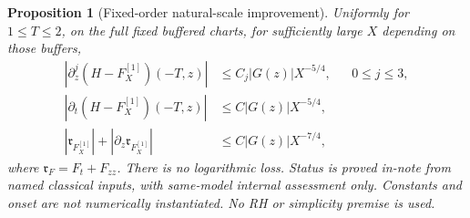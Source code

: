 \documentclass[11pt]{article}
\newtheorem{proposition}{Proposition}[section]
\numberwithin{equation}{section}
\begin{document}
\begin{proposition}[Fixed-order natural-scale improvement]
\label{prop:first-negative-correction}
Uniformly for \(1\le T\le2\), on the full fixed buffered charts, for
sufficiently large \(X\) depending on those buffers,
\begin{align}
 |\partial_z^j(H-F_X^{[1]})(-T,z)|
       &\le C_j|G(z)|X^{-5/4},&&0\le j\le3,
       \label{eq:first-negative-jets}\\
 |\partial_t(H-F_X^{[1]})(-T,z)|
       &\le C|G(z)|X^{-5/4},
       \label{eq:first-negative-time}\\
 |\mathfrak r_{F_X^{[1]}}|+|\partial_z\mathfrak r_{F_X^{[1]}}|
       &\le C|G(z)|X^{-7/4},
       \label{eq:first-negative-residual}
\end{align}
where \(\mathfrak r_F=F_t+F_{zz}\). There is no logarithmic loss.
Status is proved in-note from named classical inputs, with same-model
internal assessment only. Constants and onset are not numerically
instantiated. No RH or simplicity premise is used.
\end{proposition}
\end{document}
